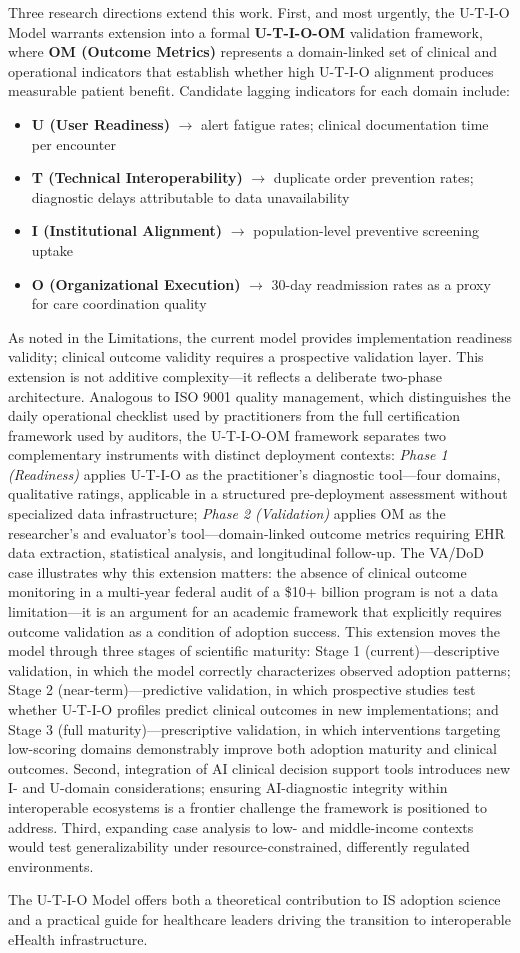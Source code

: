 Three research directions extend this work. First, and most urgently, the U-T-I-O Model warrants extension into a formal \textbf{U-T-I-O-OM} validation framework, where \textbf{OM (Outcome Metrics)} represents a domain-linked set of clinical and operational indicators that establish whether high U-T-I-O alignment produces measurable patient benefit. Candidate lagging indicators for each domain include:
\begin{itemize}
  \item \textbf{U (User Readiness)} $\rightarrow$ alert fatigue rates; clinical documentation time per encounter
  \item \textbf{T (Technical Interoperability)} $\rightarrow$ duplicate order prevention rates; diagnostic delays attributable to data unavailability
  \item \textbf{I (Institutional Alignment)} $\rightarrow$ population-level preventive screening uptake
  \item \textbf{O (Organizational Execution)} $\rightarrow$ 30-day readmission rates as a proxy for care coordination quality
\end{itemize}
As noted in the Limitations, the current model provides implementation readiness validity; clinical outcome validity requires a prospective validation layer. This extension is not additive complexity—it reflects a deliberate two-phase architecture. Analogous to ISO 9001 quality management, which distinguishes the daily operational checklist used by practitioners from the full certification framework used by auditors, the U-T-I-O-OM framework separates two complementary instruments with distinct deployment contexts: \textit{Phase 1 (Readiness)} applies U-T-I-O as the practitioner's diagnostic tool—four domains, qualitative ratings, applicable in a structured pre-deployment assessment without specialized data infrastructure; \textit{Phase 2 (Validation)} applies OM as the researcher's and evaluator's tool—domain-linked outcome metrics requiring EHR data extraction, statistical analysis, and longitudinal follow-up. The VA/DoD case illustrates why this extension matters: the absence of clinical outcome monitoring in a multi-year federal audit of a \$10+ billion program is not a data limitation—it is an argument for an academic framework that explicitly requires outcome validation as a condition of adoption success. This extension moves the model through three stages of scientific maturity: Stage 1 (current)—descriptive validation, in which the model correctly characterizes observed adoption patterns; Stage 2 (near-term)—predictive validation, in which prospective studies test whether U-T-I-O profiles predict clinical outcomes in new implementations; and Stage 3 (full maturity)—prescriptive validation, in which interventions targeting low-scoring domains demonstrably improve both adoption maturity and clinical outcomes. Second, integration of AI clinical decision support tools introduces new I- and U-domain considerations; ensuring AI-diagnostic integrity within interoperable ecosystems is a frontier challenge the framework is positioned to address. Third, expanding case analysis to low- and middle-income contexts would test generalizability under resource-constrained, differently regulated environments.

The U-T-I-O Model offers both a theoretical contribution to IS adoption science and a practical guide for healthcare leaders driving the transition to interoperable eHealth infrastructure.
